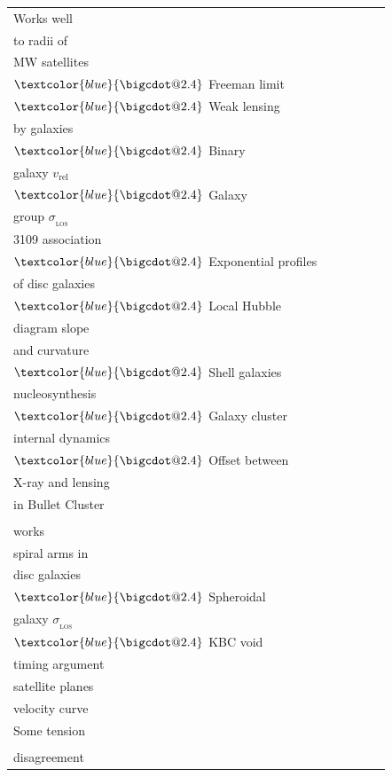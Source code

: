 \documentclass[fleqn,usenatbib,useAMS]{mnras} %
\makeatletter
\DeclareRobustCommand*\bigcdot{\mathpalette\bigcdot@{2.4}}
\DeclareRobustCommand*\bigcdot@[2]{\mathbin{\vcenter{\hbox{\scalebox{#2}{$\m@th#1\bullet$}}}}}
\makeatother
\begin{document}
\begin{table}
\begin{tabular}{llllll}
		Works well & \makecell{$\textcolor{blue}{\bigcdot}$ Tidal limit \\ to radii of \\ MW satellites \\ $\textcolor{blue}{\bigcdot}$ Freeman limit \\ $\textcolor{blue}{\bigcdot}$ Weak lensing \\ by galaxies \\ $\textcolor{blue}{\bigcdot}$ Binary \\ galaxy $v_{\text{rel}}$ \\ $\textcolor{blue}{\bigcdot}$ Galaxy \\ group $\sigma_{_\text{LOS}}$} & \makecell{$\textcolor{blue}{\bigcdot}$ RV of NGC \\ 3109 association} & \makecell{$\textcolor{blue}{\bigcdot}$ Weakly barred M33 \\ $\textcolor{blue}{\bigcdot}$ Exponential profiles \\ of disc galaxies \\ $\textcolor{blue}{\bigcdot}$ Local Hubble \\ diagram slope \\ and curvature \\ $\textcolor{blue}{\bigcdot}$ Shell galaxies} & \makecell{$\textcolor{blue}{\bigcdot}$ Big Bang \\ nucleosynthesis \\ $\textcolor{blue}{\bigcdot}$ Galaxy cluster \\ internal dynamics \\ $\textcolor{blue}{\bigcdot}$ Offset between \\ X-ray and lensing \\ in Bullet Cluster} & \makecell{} \\ \hline
		\makecell{Plausibly \\ works} & \makecell{$\textcolor{blue}{\bigcdot}$ Number of \\ spiral arms in \\ disc galaxies \\ $\textcolor{blue}{\bigcdot}$ Spheroidal \\ galaxy $\sigma_{_\text{LOS}}$ \\ $\textcolor{blue}{\bigcdot}$ KBC void} & \makecell{$\textcolor{blue}{\bigcdot}$ MW-M31 \\ timing argument} & \makecell{$\textcolor{blue}{\bigcdot}$ Local Group \\ satellite planes} & \makecell{$\textcolor{blue}{\bigcdot}$ MW escape \\ velocity curve} & \makecell{} \\ \hline
		Some tension & \makecell{} & \makecell{} & \makecell{} & \makecell{} & \makecell{} \\ \hline
		\makecell{Strong \\ disagreement} & \makecell{} & \makecell{} & \makecell{} & \makecell{} & \makecell{} \\ \hline
	\end{tabular}
	\label{MOND_overview}
\end{table}
\end{document}
